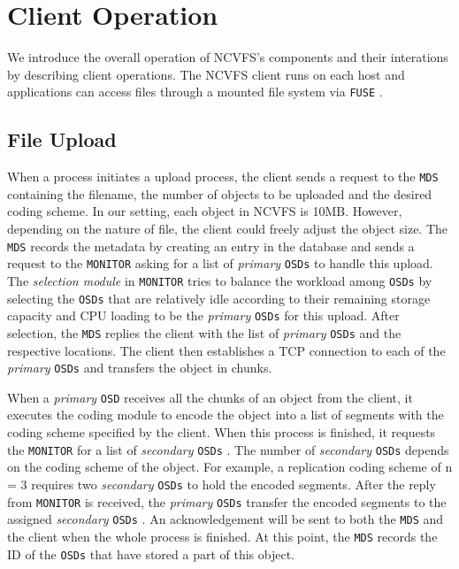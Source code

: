 \documentclass{article}
\def\osd{\texttt{OSD} }
\def\osds{\texttt{OSDs} }
\def\mds{\texttt{MDS} }
\def\fuse{\texttt{FUSE} }
\def\monitor{\texttt{MONITOR} }
\begin{document}
\section{Client Operation}
\label{client_ops}

We introduce the overall operation of NCVFS's components and their interations by describing client operations. 
The NCVFS client runs on each host and applications can access files through a mounted file system via \fuse.

\subsection{File Upload}

When a process initiates a upload process, the client sends a request to the \mds containing the filename, the number of objects 
to be uploaded and the desired coding scheme. In our setting, each object in NCVFS is 10MB. However, depending on 
the nature of file, the client could freely adjust the object size. The \mds records the metadata by creating an 
entry in the database and sends a request to the \monitor asking for a list of \textit{primary} \osds to handle this upload. 
The \textit{selection module}
in \monitor tries to balance the workload among \osds by selecting the \osds that are relatively idle according to 
their remaining storage capacity and CPU loading to be the \textit{primary} \osds for this upload. After selection, 
the \mds replies the client with the list of \textit{primary} \osds and the respective locations. The client then establishes a 
TCP connection to each of the \textit{primary} \osds and transfers the object in chunks.

When a \textit{primary} \osd receives all the chunks of an object from the client, it executes the coding module to encode the 
object into a list of segments with the coding scheme specified by the client. 
When this process is finished, it requests the \monitor for a list of 
\textit{secondary} \osds. The number of \textit{secondary} \osds depends on the coding scheme of the object. For example, a replication 
coding scheme of n = 3 requires two \textit{secondary} \osds to hold the encoded segments. After the reply from \monitor is received, the 
\textit{primary} \osds transfer the encoded segments to the assigned \textit{secondary} \osds. An acknowledgement will be sent to both the \mds and the client 
when the whole process is finished. At this point, the \mds records the ID of the \osds that have stored a part of this object.
\end{document}
